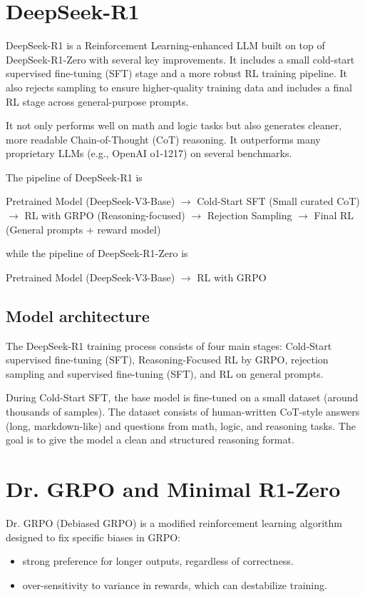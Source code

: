 \documentclass{article} %
\begin{document}
\section{DeepSeek-R1}
DeepSeek-R1 is a Reinforcement Learning-enhanced LLM built on top of DeepSeek-R1-Zero with several key improvements. It includes a small cold-start supervised fine-tuning (SFT) stage and a more robust RL training pipeline. It also rejects sampling to ensure higher-quality training data and includes a final RL stage across general-purpose prompts.

It not only performs well on math and logic tasks but also generates cleaner, more readable Chain-of-Thought (CoT) reasoning. It outperforms many proprietary LLMs (e.g., OpenAI o1-1217) on several benchmarks.

The pipeline of DeepSeek-R1 is 
\begin{center}
    Pretrained Model (DeepSeek-V3-Base) $\rightarrow$  Cold-Start SFT (Small curated CoT) $\rightarrow$  RL with GRPO (Reasoning-focused) $\rightarrow$ Rejection Sampling $\rightarrow$  Final RL (General prompts + reward model)
\end{center}
while the pipeline of DeepSeek-R1-Zero is 
\begin{center}
    Pretrained Model (DeepSeek-V3-Base) $\rightarrow$ RL with GRPO 
\end{center}

\subsection{Model architecture}
The DeepSeek-R1 training process consists of four main stages: Cold-Start supervised fine-tuning (SFT), Reasoning-Focused RL by GRPO, rejection sampling and supervised fine-tuning (SFT), and RL on general prompts.

During Cold-Start SFT, the base model is fine-tuned on a small dataset (around thousands of samples). The dataset consists of human-written CoT-style answers (long, markdown-like) and questions from math, logic, and reasoning tasks. The goal is to give the model a clean and structured reasoning format. 


\section{Dr. GRPO and Minimal R1-Zero}
Dr. GRPO (Debiased GRPO) is a modified reinforcement learning algorithm designed to fix specific biases in GRPO:
\begin{itemize}
    \item strong preference for longer outputs, regardless of correctness.
    \item over-sensitivity to variance in rewards, which can destabilize training.
\end{itemize}
\end{document}
